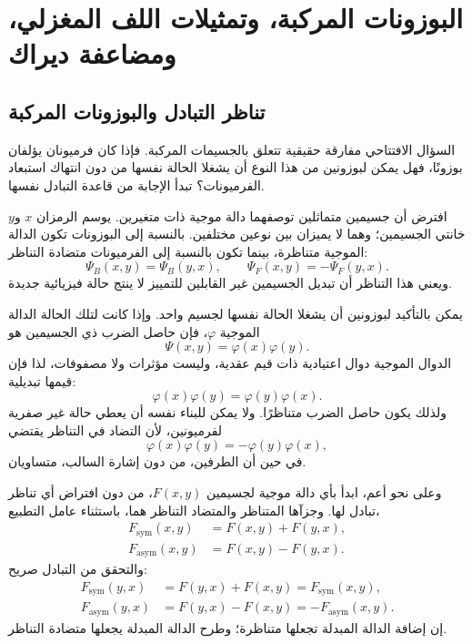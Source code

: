 \chapter{البوزونات المركبة، وتمثيلات اللف المغزلي، ومضاعفة ديراك}

\section{تناظر التبادل والبوزونات المركبة}

السؤال الافتتاحي مفارقة حقيقية تتعلق بالجسيمات المركبة. فإذا كان فرميونان يؤلفان بوزونًا، فهل يمكن لبوزونين من هذا النوع أن يشغلا الحالة نفسها من دون انتهاك استبعاد الفرميونات؟ تبدأ الإجابة من قاعدة التبادل نفسها.

افترض أن جسيمين متماثلين توصفهما دالة موجية ذات متغيرين. يوسم الرمزان \(x\) و\(y\) خانتي الجسيمين؛ وهما لا يميزان بين نوعين مختلفين. بالنسبة إلى البوزونات تكون الدالة الموجية متناظرة، بينما تكون بالنسبة إلى الفرميونات متضادة التناظر:
\begin{equation}
\Psi_B(x,y)=\Psi_B(y,x),
\qquad
\Psi_F(x,y)=-\Psi_F(y,x).
\end{equation}
ويعني هذا التناظر أن تبديل الجسيمين غير القابلين للتمييز لا ينتج حالة فيزيائية جديدة.

يمكن بالتأكيد لبوزونين أن يشغلا الحالة نفسها لجسيم واحد. وإذا كانت لتلك الحالة الدالة الموجية \(\varphi\)، فإن حاصل الضرب ذي الجسيمين هو
\begin{equation}
\Psi(x,y)=\varphi(x)\varphi(y).
\end{equation}
الدوال الموجية دوال اعتيادية ذات قيم عقدية، وليست مؤثرات ولا مصفوفات، لذا فإن قيمها تبديلية:
\begin{equation}
\varphi(x)\varphi(y)=\varphi(y)\varphi(x).
\end{equation}
ولذلك يكون حاصل الضرب متناظرًا. ولا يمكن للبناء نفسه أن يعطي حالة غير صفرية لفرميونين، لأن التضاد في التناظر يقتضي
\begin{equation}
\varphi(x)\varphi(y)=-\varphi(y)\varphi(x),
\end{equation}
في حين أن الطرفين، من دون إشارة السالب، متساويان.

وعلى نحو أعم، ابدأ بأي دالة موجية لجسيمين \(F(x,y)\)، من دون افتراض أي تناظر تبادل لها. وجزآها المتناظر والمتضاد التناظر هما، باستثناء عامل التطبيع،
\begin{align}
F_{\mathrm{sym}}(x,y)&=F(x,y)+F(y,x),\\
F_{\mathrm{asym}}(x,y)&=F(x,y)-F(y,x).
\end{align}
والتحقق من التبادل صريح:
\begin{align}
F_{\mathrm{sym}}(y,x)
&=F(y,x)+F(x,y)
=F_{\mathrm{sym}}(x,y),\\
F_{\mathrm{asym}}(y,x)
&=F(y,x)-F(x,y)
=-F_{\mathrm{asym}}(x,y).
\end{align}
إن إضافة الدالة المبدلة تجعلها متناظرة؛ وطرح الدالة المبدلة يجعلها متضادة التناظر.

